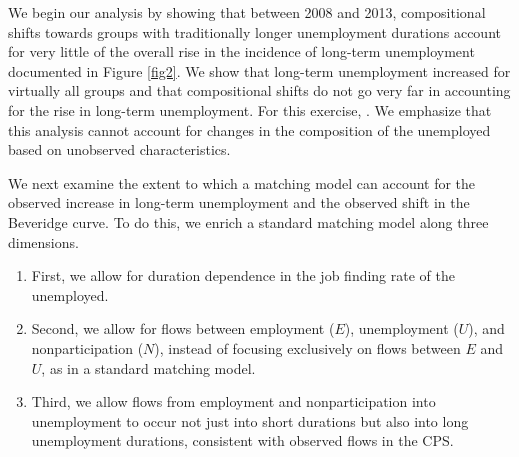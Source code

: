 \documentclass[12pt]{article}
\newcommand{\highlightPP}[1]{{\emph{\color{MyPurple}{#1}}}}
\theoremstyle{definition}
\begin{document}
We begin our analysis by showing that between 2008 and 2013, compositional shifts towards groups with traditionally longer unemployment durations account for very little of the overall rise in the incidence of long-term unemployment documented in Figure \ref{fig2}. We show that long-term unemployment increased for virtually all groups and that compositional shifts do not go very far in accounting for the rise in long-term unemployment. For this exercise, \highlightPP{compositional shifts refer to the changes in observed characteristics of unemployed workers—specifically, variables in the Current Population Survey related to demographics, occupation, industry, region, and the reason for unemployment}. We emphasize that this analysis cannot account for changes in the composition of the unemployed based on unobserved characteristics.

We next examine the extent to which a matching model can account for the observed increase in long-term unemployment and the observed shift in the Beveridge curve. To do this, we enrich a standard matching model along three dimensions. 
\begin{enumerate}[topsep=0pt, leftmargin=20pt, itemsep=0pt, label=(\arabic*)]
	\setlength{\parskip}{10pt} 
	\item First, we allow for duration dependence in the job finding rate of the unemployed.
	\item Second, we allow for flows between employment ($E$), unemployment ($U$), and nonparticipation ($N$), instead of focusing exclusively on flows between $E$ and $U$, as in a standard matching model.
	\item Third, we allow flows from employment and nonparticipation into unemployment to occur not just into short durations but also into long unemployment durations, consistent with observed flows in the CPS. 
\end{enumerate}
\end{document}
